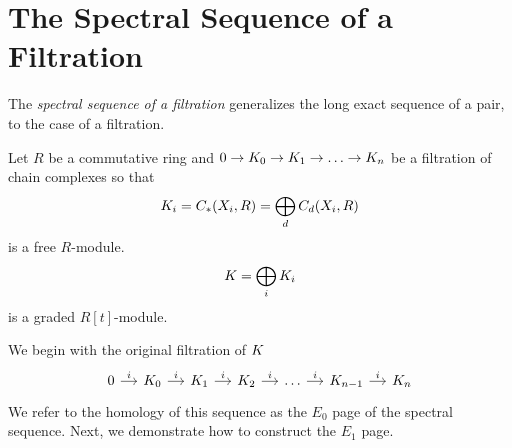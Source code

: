 \section{The Spectral Sequence of a Filtration}
\label{sec:ss-filt}
The \emph{spectral sequence of a filtration} generalizes the long exact sequence of a pair, to the case of a filtration.

Let $R$ be a commutative ring and $0 \rightarrow K_0 \rightarrow K_1 \rightarrow  \ldots \rightarrow  K_n$ 
be a filtration of chain complexes so that \[ K_i = C_*(X_i, R) = \bigoplus_d C_d(X_i, R)\] is a free $R$-module.
\[ K = \bigoplus_i K_i \] is a graded $R[t]$-module.

\noindent We begin with the original filtration of $K$
\[
\begin{tikzcd} [column sep=small]
0 \arrow{r}{i} & \K_0 \arrow{r}{i} & \K_1 \arrow{r}{i}   & \K_2 \arrow{r}{i} & \ldots \arrow{r}{i} & \K_{n-1} \arrow{r}{i} & \K_n
\end{tikzcd}
\]
We refer to the homology of this sequence as the $E_0$ page of the spectral sequence. Next, we demonstrate how to construct the $E_1$ page.

